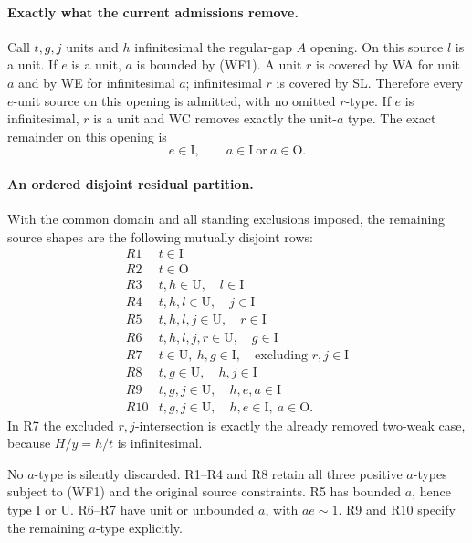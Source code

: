 \paragraph{Exactly what the current admissions remove.}
Call $t,g,j$ units and $h$ infinitesimal the regular-gap $A$ opening.
On this source $l$ is a unit. If $e$ is a unit, $a$ is bounded by
(WF1). A unit $r$ is covered by WA for unit $a$ and by WE for
infinitesimal $a$; infinitesimal $r$ is covered by SL. Therefore
every $e$-unit source on this opening is admitted, with no omitted
$r$-type. If $e$ is infinitesimal, $r$ is a unit and WC removes
exactly the unit-$a$ type. The exact remainder on this opening is
\[
 \boxed{\quad e\in\mathrm I,\qquad
             a\in\mathrm I\ \text{or}\ a\in\mathrm O.\quad}      \tag{WF2}
\]

\paragraph{An ordered disjoint residual partition.}
With the common domain and all standing exclusions imposed, the
remaining source shapes are the following mutually disjoint rows:
\[
\begin{array}{c|l}
 R1&t\in\mathrm I\\
 R2&t\in\mathrm O\\
 R3&t,h\in\mathrm U,\quad l\in\mathrm I\\
 R4&t,h,l\in\mathrm U,\quad j\in\mathrm I\\
 R5&t,h,l,j\in\mathrm U,\quad r\in\mathrm I\\
 R6&t,h,l,j,r\in\mathrm U,\quad g\in\mathrm I\\
 R7&t\in\mathrm U,\ h,g\in\mathrm I,\quad
                     \text{excluding }r,j\in\mathrm I\\
 R8&t,g\in\mathrm U,\quad h,j\in\mathrm I\\
 R9&t,g,j\in\mathrm U,\quad h,e,a\in\mathrm I\\
 R10&t,g,j\in\mathrm U,\quad h,e\in\mathrm I,\ a\in\mathrm O .
\end{array}                                                    \tag{WF3}
\]
In R7 the excluded $r,j$-intersection is exactly the already
removed two-weak case, because $H/y=h/t$ is infinitesimal.

No $a$-type is silently discarded. R1--R4 and R8 retain all three
positive $a$-types subject to (WF1) and the original source
constraints. R5 has bounded $a$, hence type $\mathrm I$ or
$\mathrm U$. R6--R7 have unit or unbounded $a$, with $ae\sim1$.
R9 and R10 specify the remaining $a$-type explicitly.

